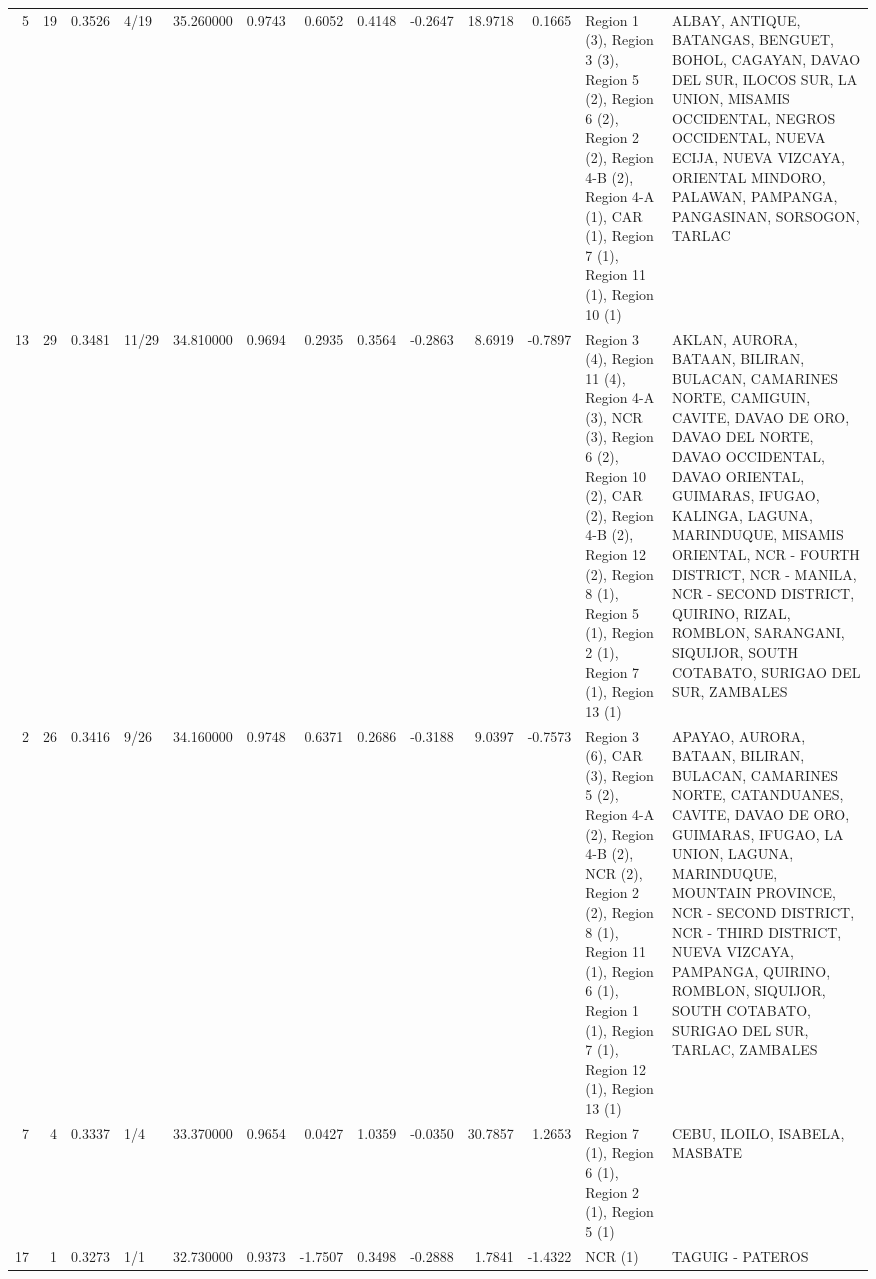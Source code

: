 \begin{tabular}{rrrlrrrrrrrll}
5 & 19 & {\cellcolor[HTML]{6C8FF1}} \color[HTML]{F1F1F1} 0.3526 & 4/19 & {\cellcolor[HTML]{6C8FF1}} \color[HTML]{F1F1F1} 35.260000 & 0.9743 & 0.6052 & 0.4148 & -0.2647 & 18.9718 & 0.1665 & Region 1 (3), Region 3 (3), Region 5 (2), Region 6 (2), Region 2 (2), Region 4-B (2), Region 4-A (1), CAR (1), Region 7 (1), Region 11 (1), Region 10 (1) & ALBAY, ANTIQUE, BATANGAS, BENGUET, BOHOL, CAGAYAN, DAVAO DEL SUR, ILOCOS SUR, LA UNION, MISAMIS OCCIDENTAL, NEGROS OCCIDENTAL, NUEVA ECIJA, NUEVA VIZCAYA, ORIENTAL MINDORO, PALAWAN, PAMPANGA, PANGASINAN, SORSOGON, TARLAC \\
13 & 29 & {\cellcolor[HTML]{6384EB}} \color[HTML]{F1F1F1} 0.3481 & 11/29 & {\cellcolor[HTML]{6384EB}} \color[HTML]{F1F1F1} 34.810000 & 0.9694 & 0.2935 & 0.3564 & -0.2863 & 8.6919 & -0.7897 & Region 3 (4), Region 11 (4), Region 4-A (3), NCR (3), Region 6 (2), Region 10 (2), CAR (2), Region 4-B (2), Region 12 (2), Region 8 (1), Region 5 (1), Region 2 (1), Region 7 (1), Region 13 (1) & AKLAN, AURORA, BATAAN, BILIRAN, BULACAN, CAMARINES NORTE, CAMIGUIN, CAVITE, DAVAO DE ORO, DAVAO DEL NORTE, DAVAO OCCIDENTAL, DAVAO ORIENTAL, GUIMARAS, IFUGAO, KALINGA, LAGUNA, MARINDUQUE, MISAMIS ORIENTAL, NCR - FOURTH DISTRICT, NCR - MANILA, NCR - SECOND DISTRICT, QUIRINO, RIZAL, ROMBLON, SARANGANI, SIQUIJOR, SOUTH COTABATO, SURIGAO DEL SUR, ZAMBALES \\
2 & 26 & {\cellcolor[HTML]{5572DF}} \color[HTML]{F1F1F1} 0.3416 & 9/26 & {\cellcolor[HTML]{5572DF}} \color[HTML]{F1F1F1} 34.160000 & 0.9748 & 0.6371 & 0.2686 & -0.3188 & 9.0397 & -0.7573 & Region 3 (6), CAR (3), Region 5 (2), Region 4-A (2), Region 4-B (2), NCR (2), Region 2 (2), Region 8 (1), Region 11 (1), Region 6 (1), Region 1 (1), Region 7 (1), Region 12 (1), Region 13 (1) & APAYAO, AURORA, BATAAN, BILIRAN, BULACAN, CAMARINES NORTE, CATANDUANES, CAVITE, DAVAO DE ORO, GUIMARAS, IFUGAO, LA UNION, LAGUNA, MARINDUQUE, MOUNTAIN PROVINCE, NCR - SECOND DISTRICT, NCR - THIRD DISTRICT, NUEVA VIZCAYA, PAMPANGA, QUIRINO, ROMBLON, SIQUIJOR, SOUTH COTABATO, SURIGAO DEL SUR, TARLAC, ZAMBALES \\
7 & 4 & {\cellcolor[HTML]{465ECF}} \color[HTML]{F1F1F1} 0.3337 & 1/4 & {\cellcolor[HTML]{465ECF}} \color[HTML]{F1F1F1} 33.370000 & 0.9654 & 0.0427 & 1.0359 & -0.0350 & 30.7857 & 1.2653 & Region 7 (1), Region 6 (1), Region 2 (1), Region 5 (1) & CEBU, ILOILO, ISABELA, MASBATE \\
17 & 1 & {\cellcolor[HTML]{3B4CC0}} \color[HTML]{F1F1F1} 0.3273 & 1/1 & {\cellcolor[HTML]{3B4CC0}} \color[HTML]{F1F1F1} 32.730000 & 0.9373 & -1.7507 & 0.3498 & -0.2888 & 1.7841 & -1.4322 & NCR (1) & TAGUIG - PATEROS \\
\bottomrule
\end{tabular}

